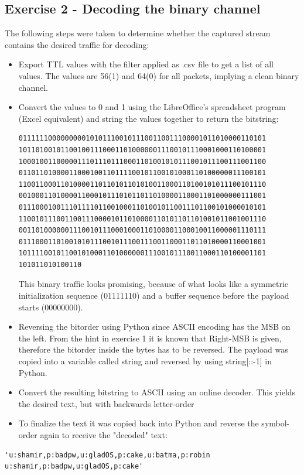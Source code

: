 \documentclass{article}
\begin{document}
\subsection*{Exercise 2 - Decoding the binary channel}
The following steps were taken to determine whether the captured stream contains the desired traffic for decoding:
\begin{itemize}
\item Export TTL values with the filter applied as .csv file to get a list of all values. The values are 56(1) and 64(0) for all packets, implying a clean binary channel.
\item Convert the values to 0 and 1 using the LibreOffice's spreadsheet program (Excel equivalent) and string the values together to return the bitstring: 
\begin{verbatim}
01111110000000001010111001011100110011100001011010000110101
10110100101100100111000110100000011100101110001000110100001
10001001100000111011101110001101001010111001011100111001100
01101101000011000100110111100101100101000110100000011100101
11001100011010000110110101101010011000110100101011100101110
00100011010000110001011101011011010000110001101000000111001
01110001001110111101100100011010010110011101100101000010101
11001011100110011100001011010000110101101101001011001001110
00110100000011100101110001000110100001100010011000001110111
01110001101001010111001011100111001100011011010000110001001
10111100101100101000110100000011100101110011000110100001101
101011010100110
\end{verbatim}
This binary traffic looks promising, because of what looks like a symmetric initialization sequence (01111110) and a buffer sequence before the payload starts (00000000).

\item Reversing the bitorder using Python since ASCII encoding has the MSB on the left. From the hint in exercise 1 it is known that Right-MSB is given, therefore the bitorder inside the bytes has to be reversed. The payload was copied into a variable called string and reversed by using string[::-1] in Python.
\item Convert the resulting bitstring to ASCII using an online decoder. This yields the desired text, but with backwards letter-order
\item To finalize the text it was copied back into Python and reverse the symbol-order again to receive the "decoded" text:
\end{itemize}

\begin{verbatim}
'u:shamir,p:badpw,u:gladOS,p:cake,u:batma,p:robin u:shamir,p:badpw,u:gladOS,p:cake'
\end{verbatim}
\end{document}
